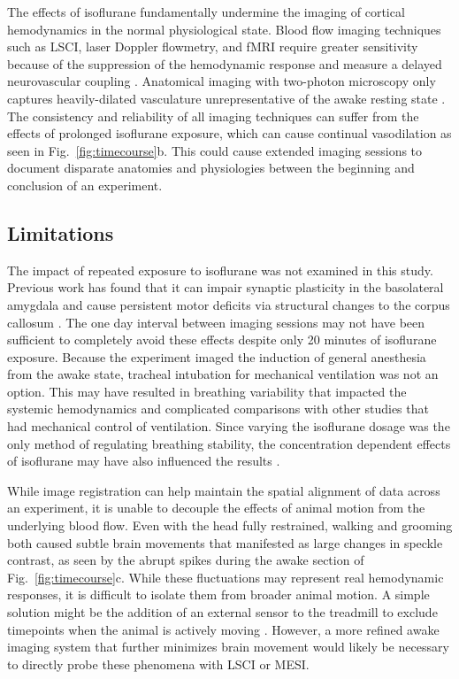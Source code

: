 \documentclass[review]{elsarticle}
\begin{document}
The effects of isoflurane fundamentally undermine the imaging of cortical hemodynamics in the normal physiological state. Blood flow imaging techniques such as LSCI, laser Doppler flowmetry, and fMRI require greater sensitivity because of the suppression of the hemodynamic response \cite{Takuwa:2012ee} and measure a delayed neurovascular coupling \cite{Pisauro:2013cx}. Anatomical imaging with two-photon microscopy only captures heavily-dilated vasculature unrepresentative of the awake resting state \cite{Lyons:2016bd}. The consistency and reliability of all imaging techniques can suffer from the effects of prolonged isoflurane exposure, which can cause continual vasodilation as seen in Fig.~\ref{fig:timecourse}b. This could cause extended imaging sessions to document disparate anatomies and physiologies between the beginning and conclusion of an experiment.



\subsection{Limitations}

The impact of repeated exposure to isoflurane was not examined in this study. Previous work has found that it can impair synaptic plasticity in the basolateral amygdala \cite{Long:2016ri} and cause persistent motor deficits via structural changes to the corpus callosum \cite{Bajwa:2018ri}. The one day interval between imaging sessions may not have been sufficient to completely avoid these effects despite only 20 minutes of isoflurane exposure. Because the experiment imaged the induction of general anesthesia from the awake state, tracheal intubation for mechanical ventilation was not an option. This may have resulted in breathing variability that impacted the systemic hemodynamics and complicated comparisons with other studies that had mechanical control of ventilation. Since varying the isoflurane dosage was the only method of regulating breathing stability, the concentration dependent effects of isoflurane may have also influenced the results \cite{Masamoto:2009dd,Li:2014eh}.

While image registration can help maintain the spatial alignment of data across an experiment, it is unable to decouple the effects of animal motion from the underlying blood flow. Even with the head fully restrained, walking and grooming both caused subtle brain movements that manifested as large changes in speckle contrast, as seen by the abrupt spikes during the awake section of Fig.~\ref{fig:timecourse}c. While these fluctuations may represent real hemodynamic responses, it is difficult to isolate them from broader animal motion. A simple solution might be the addition of an external sensor to the treadmill to exclude timepoints when the animal is actively moving \cite{Dombeck:2007gr}. However, a more refined awake imaging system that further minimizes brain movement would likely be necessary to directly probe these phenomena with LSCI or MESI.
\end{document}
